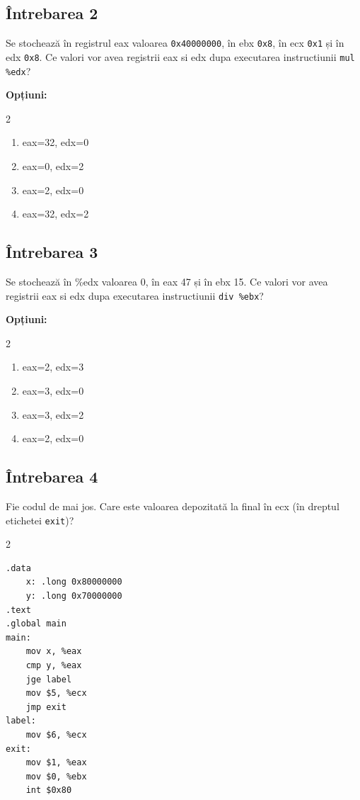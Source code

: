 \documentclass[12pt,a4paper]{article}
\begin{document}
\subsection*{Întrebarea 2}
Se stochează în registrul eax valoarea \texttt{0x40000000}, în ebx \texttt{0x8}, în ecx \texttt{0x1} și în edx \texttt{0x8}. Ce valori vor avea registrii eax si edx dupa executarea instructiunii \texttt{mul \%edx}?

\textbf{Opțiuni:}
\begin{multicols}{2}     
\begin{enumerate}[label=\alph*)]
    \item eax=32, edx=0
    \item eax=0, edx=2
    \item eax=2, edx=0
    \item eax=32, edx=2
\end{enumerate}
\end{multicols}

\subsection*{Întrebarea 3}
Se stochează în \%edx valoarea 0, în eax 47 și în ebx 15. Ce valori vor avea registrii eax si edx dupa executarea instructiunii \texttt{div \%ebx}?

\textbf{Opțiuni:}
\begin{multicols}{2}     
\begin{enumerate}[label=\alph*)]
    \item eax=2, edx=3
    \item eax=3, edx=0
    \item eax=3, edx=2
    \item eax=2, edx=0
\end{enumerate}
\end{multicols}

\subsection*{Întrebarea 4}
Fie codul de mai jos. Care este valoarea depozitată la final în ecx (în dreptul etichetei \texttt{exit})?

\begin{multicols}{2}
\begin{lstlisting}[language=x86asm]
.data
    x: .long 0x80000000
    y: .long 0x70000000
.text
.global main
main:
    mov x, %eax
    cmp y, %eax
    jge label
    mov $5, %ecx
    jmp exit
label:
    mov $6, %ecx
exit:
    mov $1, %eax
    mov $0, %ebx
    int $0x80
\end{lstlisting}
\end{multicols}
\end{document}
